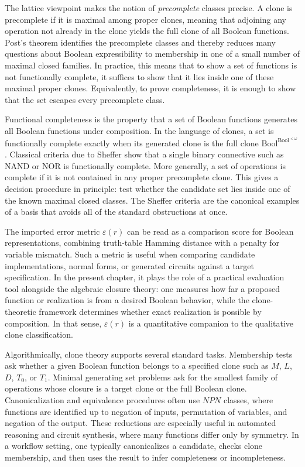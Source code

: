 \documentclass[11pt]{article}
\begin{document}
The lattice viewpoint makes the notion of \emph{precomplete} classes precise. A clone is precomplete if it is maximal among proper clones, meaning that adjoining any operation not already in the clone yields the full clone of all Boolean functions. Post's theorem identifies the precomplete classes and thereby reduces many questions about Boolean expressibility to membership in one of a small number of maximal closed families. In practice, this means that to show a set of functions is not functionally complete, it suffices to show that it lies inside one of these maximal proper clones. Equivalently, to prove completeness, it is enough to show that the set escapes every precomplete class.

Functional completeness is the property that a set of Boolean functions generates all Boolean functions under composition. In the language of clones, a set is functionally complete exactly when its generated clone is the full clone \(\mathrm{Bool}^{\mathrm{Bool}^{<\omega}}\). Classical criteria due to Sheffer show that a single binary connective such as NAND or NOR is functionally complete. More generally, a set of operations is complete if it is not contained in any proper precomplete clone. This gives a decision procedure in principle: test whether the candidate set lies inside one of the known maximal closed classes. The Sheffer criteria are the canonical examples of a basis that avoids all of the standard obstructions at once.

The imported error metric \(\varepsilon(r)\) can be read as a comparison score for Boolean representations, combining truth-table Hamming distance with a penalty for variable mismatch. Such a metric is useful when comparing candidate implementations, normal forms, or generated circuits against a target specification. In the present chapter, it plays the role of a practical evaluation tool alongside the algebraic closure theory: one measures how far a proposed function or realization is from a desired Boolean behavior, while the clone-theoretic framework determines whether exact realization is possible by composition. In that sense, \(\varepsilon(r)\) is a quantitative companion to the qualitative clone classification.

Algorithmically, clone theory supports several standard tasks. Membership tests ask whether a given Boolean function belongs to a specified clone such as \(M\), \(L\), \(D\), \(T_0\), or \(T_1\). Minimal generating set problems ask for the smallest family of operations whose closure is a target clone or the full Boolean clone. Canonicalization and equivalence procedures often use \(NPN\) classes, where functions are identified up to negation of inputs, permutation of variables, and negation of the output. These reductions are especially useful in automated reasoning and circuit synthesis, where many functions differ only by symmetry. In a workflow setting, one typically canonicalizes a candidate, checks clone membership, and then uses the result to infer completeness or incompleteness.
\end{document}
